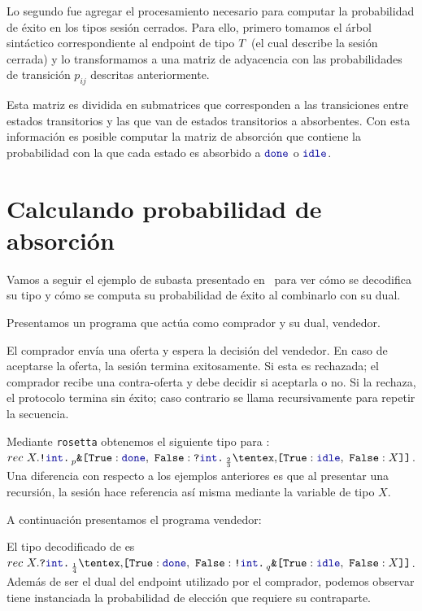 Lo segundo fue agregar el procesamiento necesario para computar la probabilidad
de éxito en los tipos sesión cerrados. Para ello, primero tomamos el árbol
sintáctico correspondiente al endpoint de tipo $T$ (el cual describe
la sesión cerrada) y lo transformamos a una matriz de adyacencia con las
probabilidades de transición $p_{ij}$ descritas anteriormente.

Esta matriz es dividida en submatrices que corresponden a las transiciones
entre estados transitorios y las que van de estados transitorios a absorbentes.
Con esta información es posible computar la matriz de absorción que contiene la
probabilidad con la que cada estado es absorbido a $\Done$ o $\Idle$.

\section{Calculando probabilidad de absorción}

Vamos a seguir el ejemplo de subasta presentado
en~\cite{DBLP:conf/concur/InversoMPTT20} para ver cómo se decodifica su tipo y
cómo se computa su probabilidad de éxito al combinarlo con su dual.

Presentamos un programa que actúa como comprador y su dual, vendedor.

\AuctionBuyer

El comprador envía una oferta y espera la decisión del vendedor. En caso de
aceptarse la oferta, la sesión termina exitosamente. Si esta es rechazada; el
comprador recibe una contra-oferta y debe decidir si aceptarla o no. Si la
rechaza, el protocolo termina sin éxito; caso contrario se llama recursivamente
para repetir la secuencia.

Mediante \texttt{rosetta} obtenemos el siguiente tipo para : $rec\
X.\Out\tint\BinaryPBranch[p]{\Done}{\In\tint\BinaryPChoice[\frac{2}{3}]{\Idle}{X}}$.
Una diferencia con respecto a los ejemplos anteriores es que al presentar una
recursión, la sesión hace referencia así misma mediante la variable de tipo $X$.

A continuación presentamos el programa vendedor:

\AuctionSeller

El tipo decodificado de  es $rec\
X.\In\tint\BinaryPChoice[\frac{1}{4}]{\Done}{\Out\tint\BinaryPBranch[q]{\Idle}{X}}$.
Además de ser el dual del endpoint utilizado por el comprador, podemos observar
tiene instanciada la probabilidad de elección que requiere su contraparte.

